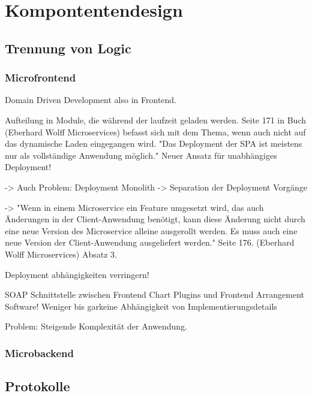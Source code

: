 \chapter{Kompontentendesign}



\section{Trennung von Logic}


\subsection{Microfrontend}
Domain Driven Development also in Frontend.

Aufteilung in Module, die während der laufzeit geladen werden.
Seite 171 in Buch (Eberhard Wolff Microservices) befasst sich mit dem
Thema, wenn auch nicht auf das dynamische Laden eingegangen wird.
"Das Deployment der SPA ist meistens nur als vollständige Anwendung möglich."
Neuer Ansatz für unabhängiges Deployment!

-> Auch Problem: Deployment Monolith -> Separation der Deployment Vorgänge

-> "Wenn in einem Microservice ein Feature umgesetzt wird, das auch Änderungen
in der Client-Anwendung benötigt, kann diese Änderung nicht durch eine neue
Version des Microservice alleine ausgerollt werden. Es muss auch eine neue Version
der Client-Anwendung ausgeliefert werden." Seite 176.  (Eberhard Wolff Microservices)
Absatz 3.

Deployment abhängigkeiten verringern!

SOAP Schnittstelle zwischen Frontend Chart Plugins und Frontend Arrangement Software!
Weniger bis garkeine Abhängigkeit von Implementierungsdetails

Problem: Steigende Komplexität der Anwendung.

\subsection{Microbackend}

\section{Protokolle}
